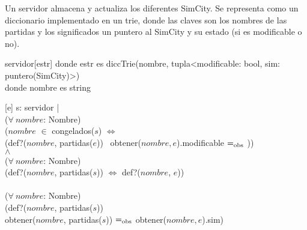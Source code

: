 \begin{Representacion}
  
  
    Un servidor almacena y actualiza los diferentes SimCity. Se representa como un 
    diccionario implementado en un trie, donde las claves son los nombres de las partidas
    y los significados un puntero al SimCity y su estado (si es modificable o no).
  
    \begin{Estructura}{servidor}[estr]
        \tab donde estr es diccTrie(nombre, tupla<modificable: bool, sim: puntero(SimCity)>) \\
        \tab donde nombre es string
    \end{Estructura}
    
    
    [e]{
        s: servidor | \\
            \tab ($\forall\ nombre$: Nombre)\\
                \tab\tab ($nombre$ $\in$ congelados($s$) $\Leftrightarrow$ \\
                \tab\tab (def?($nombre$, partidas($e$)) \yluego\ obtener($nombre, e$).modificable $=_{\mathrm{obs}}$ \false)) \\
            \tab $\wedge$ \\
            \tab ($\forall\ nombre$: Nombre)\\
                \tab\tab (def?($nombre$, partidas($s$)) $\Leftrightarrow$ def?($nombre$, $e$)) \\
            \tab \yluego \\
            \tab ($\forall\ nombre$: Nombre)\\
                \tab\tab (def?($nombre$, partidas($s$)) \impluego \\ 
                \tab\tab  obtener($nombre$, partidas($s$)) $=_{\mathrm{obs}}$ obtener($nombre, e$).sim) \\
    }
  
  \end{Representacion}
